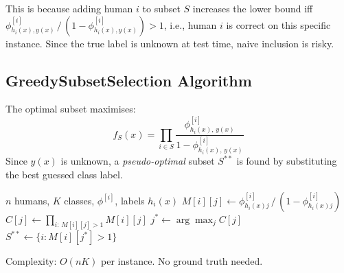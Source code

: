 \documentclass[10pt,twocolumn]{article}
\begin{document}
This is because adding human $i$ to subset $S$ increases the lower
bound iff $\phi^{[i]}_{h_i(x),y(x)}\,/\,(1-\phi^{[i]}_{h_i(x),y(x)}) > 1$,
i.e., human $i$ is correct on this specific instance. Since the true
label is unknown at test time, naive inclusion is risky.

\subsection{GreedySubsetSelection Algorithm}

The optimal subset maximises:
\[
  f_S(x) = \prod_{i\in S}
  \frac{\phi^{[i]}_{h_i(x),\,y(x)}}{1-\phi^{[i]}_{h_i(x),\,y(x)}}
\]
Since $y(x)$ is unknown, a \emph{pseudo-optimal} subset $S^{**}$ is
found by substituting the best guessed class label.

\begin{algorithm}[H]
\caption{GreedySubsetSelection (Paper 1, Alg.\ 1)}
\label{alg:greedy}
\small
\begin{algorithmic}[1]
  \Require $n$ humans, $K$ classes, $\phi^{[i]}$, labels $h_i(x)$
    \State $M[i][j]\leftarrow
      \phi^{[i]}_{h_i(x)j}\,/\,(1-\phi^{[i]}_{h_i(x)j})$
  \EndFor
    \State $C[j]\leftarrow\prod_{i:\,M[i][j]>1} M[i][j]$
  \EndFor
  \State $j^*\leftarrow\arg\max_j C[j]$
  \State \Return $S^{**}\leftarrow\{i : M[i][j^*]>1\}$
\end{algorithmic}
\end{algorithm}

\noindent Complexity: $O(nK)$ per instance. No ground truth needed.
\end{document}
